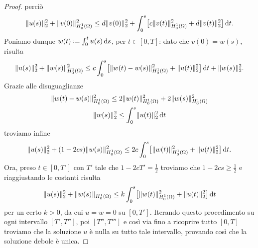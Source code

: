 \begin{proof}
    perciò
    \begin{equation}
        \norm{u(s)}_2^2+\norm{v(0)}_{\sobHc[1]{\Omega}}^2\le
        d\norm{v(0)}_2^2+\int_0^s\bigl[c\norm{v(t)}_{\sobHc[1]{\Omega}}^2+d\norm{v(t)}_2^2\bigr]\,\dd t.
    \end{equation}
    Poniamo dunque $w(t)\defeq\int_0^t u(s)\,\dd s$, per $t\in[0,T]$: dato che $v(0)=w(s)$, risulta
    \begin{equation}
        \norm{u(s)}_2^2+\norm{w(s)}_{\sobHc[1]{\Omega}}^2\le
        c\int_0^s\bigl[\norm{w(t)-w(s)}_{\sobHc[1]{\Omega}}^2+\norm{u(t)}_2^2\bigr]\,\dd t+\norm{w(s)}_2^2.
    \end{equation}
    Grazie alle disuguaglianze
    \begin{gather}
        \norm{w(t)-w(s)}_{\sobHc[1]{\Omega}}^2 \le 2\norm{w(t)}_{\sobHc[1]{\Omega}}^2+2\norm{w(s)}_{\sobHc[1]{\Omega}}^2\\
        \norm{w(s)}_2^2 \le \int_0^s\norm{u(t)}_2^2\,\dd t
    \end{gather}
    troviamo infine
    \begin{equation}
        \norm{u(s)}_2^2+(1-2cs)\norm{w(s)}_{\sobHc[1]{\Omega}}^2\le
        2c\int_0^s\bigl[\norm{w(t)}_{\sobHc[1]{\Omega}}^2+\norm{u(t)}_2^2\bigr]\,\dd t.
    \end{equation}
    Ora, preso $t\in[0,T']$ con $T'$ tale che $1-2cT'=\frac12$ troviamo che $1-2cs\ge\frac12$ e riaggiustando le costanti risulta
    \begin{equation}
        \norm{u(s)}_2^2+\norm{w(s)}_{\sobHc[1]{\Omega}}\le k\int_0^s\bigl[\norm{w(t)}_{\sobHc[1]{\Omega}}^2+\norm{u(t)}_2^2\bigr]\,\dd t
    \end{equation}
    per un certo $k>0$, da cui $u=w=0$ su $[0,T']$.
    Iterando questo procedimento su ogni intervallo $[T',T'']$, poi $[T'',T''']$ e cos\`i via fino a ricoprire tutto $[0,T]$ troviamo che la soluzione $u$ è nulla su tutto tale intervallo, provando cos\`i che la soluzione debole è unica.
\end{proof}
